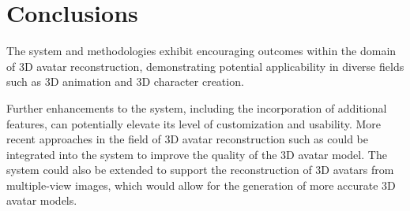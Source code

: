 \section{Conclusions}\label{sec:conclusions}

The system and methodologies exhibit encouraging outcomes within the domain of 3D avatar reconstruction, demonstrating potential applicability in diverse fields such as 3D animation and 3D character creation. 

Further enhancements to the system, including the incorporation of additional features, can potentially elevate its level of customization and usability. More recent approaches in the field of 3D avatar reconstruction such as  could be integrated into the system to improve the quality of the 3D avatar model. The system could also be extended to support the reconstruction of 3D avatars from multiple-view images, which would allow for the generation of more accurate 3D avatar models.